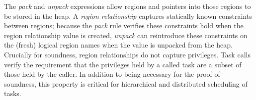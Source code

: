 The {\em pack} and {\em unpack} expressions allow regions and pointers into those regions to be stored in the heap.
A {\em region relationship} captures statically known constraints between regions;
because the {\em pack} rule verifies these constraints hold when the 
region relationship value is created, {\em unpack} can reintroduce these constraints on
the (fresh) logical region names when the value is unpacked from the heap.
Crucially for soundness, region relationships do not capture privileges.
%
% 
Task calls verify the requirement that the privileges held by a called task are a subset of those held
by the caller.  In addition to being necessary for the proof of soundness, this property is critical for 
hierarchical and distributed scheduling of tasks.

